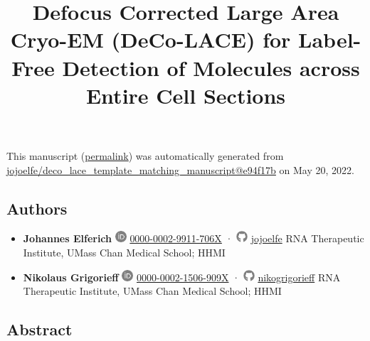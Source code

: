 \documentclass[
]{article}
\title{Defocus Corrected Large Area Cryo-EM (DeCo-LACE) for Label-Free Detection of Molecules across Entire Cell Sections}
\author{}
\date{}
\begin{document}
\maketitle

This manuscript
(\href{https://jojoelfe.github.io/deco_lace_template_matching_manuscript/v/e94f17b00fe53a7b703becda30c7a1b1503e6e7e/}{permalink})
was automatically generated
from \href{https://github.com/jojoelfe/deco_lace_template_matching_manuscript/tree/e94f17b00fe53a7b703becda30c7a1b1503e6e7e}{jojoelfe/deco\_lace\_template\_matching\_manuscript@e94f17b}
on May 20, 2022.

\hypertarget{authors}{%
\subsection{Authors}\label{authors}}

\begin{itemize}
\item
  \textbf{Johannes Elferich}
  \includegraphics[width=0.16667in,height=0.16667in]{images/orcid.pdf}
  \href{https://orcid.org/0000-0002-9911-706X}{0000-0002-9911-706X}
  · \includegraphics[width=0.16667in,height=0.16667in]{images/github.pdf}
  \href{https://github.com/jojoelfe}{jojoelfe}
  RNA Therapeutic Institute, UMass Chan Medical School; HHMI
\item
  \textbf{Nikolaus Grigorieff}
  \includegraphics[width=0.16667in,height=0.16667in]{images/orcid.pdf}
  \href{https://orcid.org/0000-0002-1506-909X}{0000-0002-1506-909X}
  · \includegraphics[width=0.16667in,height=0.16667in]{images/github.pdf}
  \href{https://github.com/nikogrigorieff}{nikogrigorieff}
  RNA Therapeutic Institute, UMass Chan Medical School; HHMI
\end{itemize}

\hypertarget{abstract}{%
\subsection{Abstract}\label{abstract}}
\end{document}
